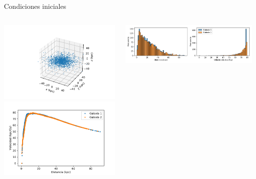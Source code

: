 \documentclass{beamer}
\begin{document}
\begin{frame}{Condiciones iniciales}
	\begin{columns}
		\begin{column}{0.5\textwidth}
			\includegraphics[height=0.35\textheight]{sources/images/galaxy_shape.pdf}\\\pause
			\includegraphics[height=0.35\textheight]{sources/images/rotation_curve.pdf}\pause
		\end{column}
		\begin{column}{0.65\textwidth}
			\includegraphics[width=\linewidth]{sources/images/galaxy_distribution.pdf}\\\pause

\end{column}
\end{columns}
\end{frame}
\end{document}
